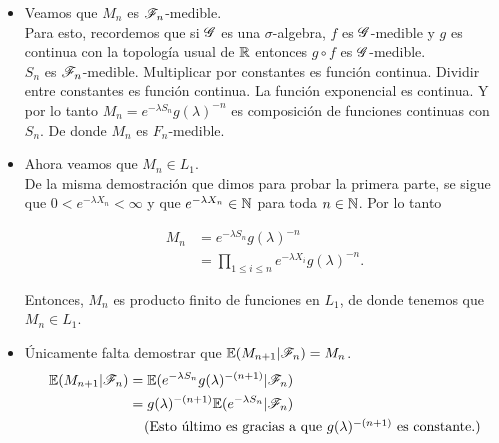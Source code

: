     \begin{itemize}
        \item 
            Veamos que $M_n$ es $\mathscr{F}_n$-medible.\\
            
            Para esto, recordemos que si $\mathscr{G}$ es una $\sigma$-algebra, $f$ es $\mathscr{G}$-medible y $g$ es continua
            con la topología usual de $\mathbb{R}$ entonces $g \circ f$ es $\mathscr{G}$-medible.\\
            
            $S_n$ es $\mathscr{F}_n$-medible. Multiplicar por constantes es función continua. Dividir entre constantes 
            es función continua. La función exponencial es continua. Y por lo tanto $M_n=e^{-\lambda S_n}g(\lambda)^{-n}$ 
            es composición de funciones continuas con $S_n$. De donde $M_n$ es $F_n$-medible.\\
         
        \item 
            Ahora veamos que $M_n \in L_1$.\\
            
            De la misma demostración que dimos para probar la primera parte, se sigue 
            que $0 < e^{-\lambda X_n} < \infty$ y que $e^{-\lambda X_n} \in \mathbb{N}$ para toda $n \in \mathbb{N}$. Por lo tanto
            
            \begin{align}
                M_n         &=      e^{-\lambda S_n}g(\lambda)^{-n} \\
                            &=      \prod_{1 \leq i \leq n} e^{-\lambda X_i} g(\lambda)^{-n}. 
            \end{align}
            
            Entonces, $M_n$ es producto finito de funciones en $L_1$, de donde tenemos que $M_n \in L_1$.\\
            
         \item
            Únicamente falta demostrar que $\mathbb{E}(M_{n+1} | \mathscr{F}_n) = M_n$.\\
            
            \begin{align}
                \mathbb{E}(M_{n+1} | \mathscr{F}_n)     &=   \mathbb{E}(e^{-\lambda S_n}g(\lambda)^{-(n+1)}|\mathscr{F}_n)      \\
                                       &=   g(\lambda)^{-(n+1)}\mathbb{E}(e^{-\lambda S_n}|\mathscr{F}_n)      \\
                                       &\;\;\;\;\mbox{(Esto último es gracias a que $g(\lambda)^{-(n+1)}$ es constante.)}
            \end{align}
            
            
    \end{itemize}